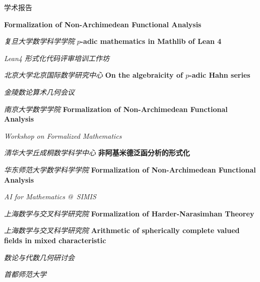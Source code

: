 \begin{rubric}{学术报告}

%
\entry*[2026, Sept. 18th]%
	\textbf{Formalization of Non-Archimedean Functional Analysis}
	\par \emph{复旦大学数学科学学院}
\entry*[2026, Jul. 20th]%
	\textbf{$p$-adic mathematics in Mathlib of Lean 4}
	\par \emph{Lean4 形式化代码评审培训工作坊}
	\par \emph{北京大学北京国际数学研究中心}
\entry*[2026, Apr. 17th]%
	\textbf{On the algebraicity of $p$-adic Hahn series}
	\par \emph{金陵数论算术几何会议}
	\par \emph{南京大学数学学院}
\entry*[2026, Apr. 16th]%
	\textbf{Formalization of Non-Archimedean Functional Analysis}
	\par \emph{Workshop on Formalized Mathematics}
	\par \emph{清华大学丘成桐数学科学中心}
\entry*[2026, Apr. 9th]%
	\textbf{非阿基米德泛函分析的形式化}
	\par \emph{华东师范大学数学科学学院}
\entry*[2026, Apr. 7th]%
	\textbf{Formalization of Non-Archimedean Functional Analysis}
	\par \emph{AI for Mathematics \makeatletter @\makeatother \ SIMIS}
	\par \emph{上海数学与交叉科学研究院}
\entry*[2025, Nov. 19th]%
	\textbf{Formalization of Harder-Narasimhan Theorey}
	\par \emph{上海数学与交叉科学研究院}
\entry*[2025, Jun. 13th]%
	\textbf{Arithmetic of spherically complete valued fields in mixed characteristic}
	\par \emph{数论与代数几何研讨会}
	\par \emph{首都师范大学}

\end{rubric}

